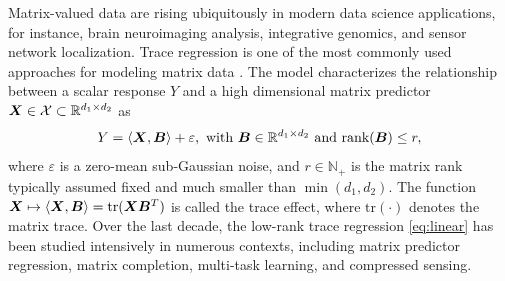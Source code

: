 \documentclass[11pt]{article}
\theoremstyle{plain}
\theoremstyle{definition}
\begin{document}
Matrix-valued data are rising ubiquitously in modern data science applications, for instance, brain neuroimaging analysis, integrative genomics, and sensor network localization. Trace regression is one of the most commonly used approaches for modeling matrix data \citep{fan2019generalized,hamidi2019low}. The model characterizes the relationship between a scalar response $Y$ and a high dimensional matrix predictor $\bm X \in \mathcal{X} \subset \mathbb{R}^{d_1\times d_2}$ as 
\begin{equation}\label{eq:linear}
Y=\langle \bm X, \bm B \rangle+ \varepsilon,\ \text{with } \bm B \in \mathbb{R}^{d_1\times d_2} \text{ and rank}(\bm B)\leq r,
\end{equation}
where $\varepsilon$ is a zero-mean sub-Gaussian noise, and $r\in\mathbb{N}_{+}$ is the matrix rank typically assumed fixed and much smaller than $\min(d_1,d_2)$. The function $\bm X\mapsto \langle \bm X,\bm B\rangle=\text{tr}(\bm X\bm B^T)$ is called the trace effect, where $\text{tr}(\cdot)$ denotes the matrix trace. Over the last decade, the low-rank trace regression \eqref{eq:linear} has been studied intensively in numerous contexts, including matrix predictor regression, matrix completion, multi-task learning, and compressed sensing.
\end{document}
